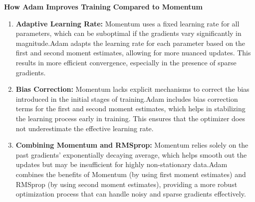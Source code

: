 \begin{qsolve}
\begin{qsolve}[]
        \textbf{How Adam Improves Training Compared to Momentum}
        \begin{enumerate}
            \item \textbf{Adaptive Learning Rate:} Momentum uses a fixed learning rate for all parameters, which can be suboptimal if the gradients vary significantly in magnitude.Adam adapts the learning rate for each parameter based on the first and second moment estimates, allowing for more nuanced updates. This results in more efficient convergence, especially in the presence of sparse gradients.    
            \item \textbf{Bias Correction:} Momentum lacks explicit mechanisms to correct the bias introduced in the initial stages of training.Adam includes bias correction terms for the first and second moment estimates, which helps in stabilizing the learning process early in training. This ensures that the optimizer does not underestimate the effective learning rate.
            \item \textbf{Combining Momentum and RMSprop:} Momentum relies solely on the past gradients' exponentially decaying average, which helps smooth out the updates but may be insufficient for highly non-stationary data.Adam combines the benefits of Momentum (by using first moment estimates) and RMSprop (by using second moment estimates), providing a more robust optimization process that can handle noisy and sparse gradients effectively.
        \end{enumerate}
    \end{qsolve}
\end{qsolve}
